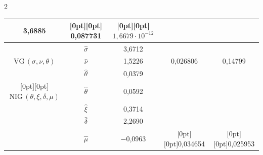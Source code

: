 \begin{multicols}{2}
{\begin{center}
\begin{tabular}{|c|c|c|c|c|}
3,6885 &


\multicolumn{1}{c|}{\raisebox{6pt}[0pt][0pt]{ 0,087731}} & 


\multicolumn{1}{c|}{\raisebox{6pt}[0pt][0pt]{$1{,}6679\cdot 10^{-12}$}}\\


                                \hline


                                & $\hat \sigma$ & 3,6712 &  &   \\ 




$\mathrm{VG}\,(\sigma, \nu, \theta)$& $\hat \nu$ & 1,5226 & 0,026806 &   0,14799  \\ 




                                & $\hat \theta$ & 0,0379 &  & 


\\


                                \hline


\multicolumn{1}{|c|}{\raisebox{-18pt}[0pt][0pt]{$\mathrm{NIG}\,(\theta, \xi, \delta, \mu)$}}


                                & $\hat \theta$ & 0,0592 &  &   \\ 




                                & $\hat \xi$ & 0,3714 &  &   \\ 




                                & $\hat \delta$ & 2,2690 &  &   \\ 




                                & $\hat \mu$ & $-$0,0963 & 


 \multicolumn{1}{c|}{\raisebox{18pt}[0pt][0pt]{0,034654}} & 


 \multicolumn{1}{c|}{\raisebox{18pt}[0pt][0pt]{0,025953}}  


\\


                                \hline


                        \end{tabular}


                        \vspace*{3pt}


\end{center}


}





\pagebreak





\end{multicols}





